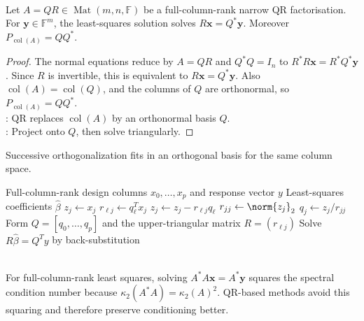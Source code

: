 \begin{proposition} \label{prop:qr-least-squares-and-projection} \\
Let $A=QR\in\operatorname{Mat}(m,n,\mathbb{F})$ be a full-column-rank narrow QR factorisation. For $\mathbf{y}\in\mathbb{F}^m$, the least-squares solution solves $R\mathbf{x}=Q^*\mathbf{y}$. Moreover $P_{\operatorname{col}(A)}=QQ^*$.
\begin{proof}
The normal equations reduce by $A=QR$ and $Q^*Q=I_n$ to $R^*R\mathbf{x}=R^*Q^*\mathbf{y}$.
Since $R$ is invertible, this is equivalent to $R\mathbf{x}=Q^*\mathbf{y}$. Also $\operatorname{col}(A)=\operatorname{col}(Q)$, and the columns of $Q$ are orthonormal, so $P_{\operatorname{col}(A)}=QQ^*$.\\
: QR replaces $\operatorname{col}(A)$ by an orthonormal basis $Q$.\\
: Project onto $Q$, then solve triangularly.
\end{proof}
\end{proposition}

Successive orthogonalization fits in an orthogonal basis for the same column space.

\begin{breakablealgorithm}
\caption{Least Squares by Successive Orthogonalization}
\label{alg:sl-successive-orthogonalization-least-squares}
\begin{algorithmic}
\Require Full-column-rank design columns $x_0,\ldots,x_p$ and response vector $y$
\Ensure Least-squares coefficients $\widehat{\beta}$
\State $z_j\gets x_j$
\State $r_{\ell j}\gets q_\ell^Tx_j$
\State $z_j\gets z_j-r_{\ell j}q_\ell$
\EndFor
\State $r_{jj}\gets \norm{z_j}_2$
\State $q_j\gets z_j/r_{jj}$
\EndFor
\State Form $Q=[q_0,\ldots,q_p]$ and the upper-triangular matrix $R=(r_{\ell j})$
\State Solve $R\widehat{\beta}=Q^Ty$ by back-substitution
\end{algorithmic}
\end{breakablealgorithm}

\begin{perspective} \label{per:normal-equations-squaring-condition-number} \\
For full-column-rank least squares, solving $A^*A\mathbf{x}=A^*\mathbf{y}$ squares the spectral condition number because $\kappa_2(A^*A)=\kappa_2(A)^2$. QR-based methods avoid this squaring and therefore preserve conditioning better.
\end{perspective}

